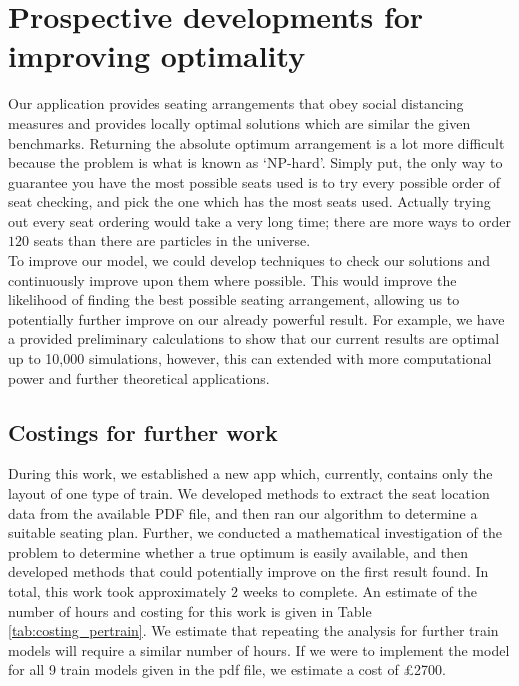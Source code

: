 \documentclass[11pt,a4paper]{article}
\begin{document}
\section*{Prospective developments for improving optimality}
Our application provides seating arrangements that obey social distancing measures and provides locally optimal solutions which are similar the given benchmarks. Returning the  absolute optimum arrangement  is a lot more difficult because the problem is what is known as `NP-hard'.  Simply put, the only way to guarantee you have the most possible seats used is to try every possible order of seat checking, and pick the one which has the most seats used. Actually trying out every seat ordering would take a very long time; there are more ways to order $120$ seats than there are particles in the universe.\\

To improve our model, we could develop techniques to check our solutions and continuously improve upon them where possible. This would improve the likelihood of finding the best possible seating arrangement, allowing us to potentially further improve on our already powerful result. For example, we have a provided preliminary calculations to show that our current results are optimal up to 10,000 simulations, however, this can extended with more computational power and further theoretical applications.\\


\subsection*{Costings for further work}
During this work, we established a new app which, currently, contains only the layout of one type of train. We developed methods to extract the seat location data from the available PDF file, and then ran our algorithm to determine a suitable seating plan. Further, we conducted a mathematical investigation of the problem to determine whether a true optimum is easily available, and then developed methods that could potentially improve on the first result found. In total, this work took approximately $2$ weeks to complete. An estimate of the number of hours and costing for this work is given in Table \ref{tab:costing_pertrain}. We estimate that repeating the analysis for further train models will require a similar number of hours. If we were to implement the model for all 9 train models given in the pdf file, we estimate a cost of £2700.
\end{document}
